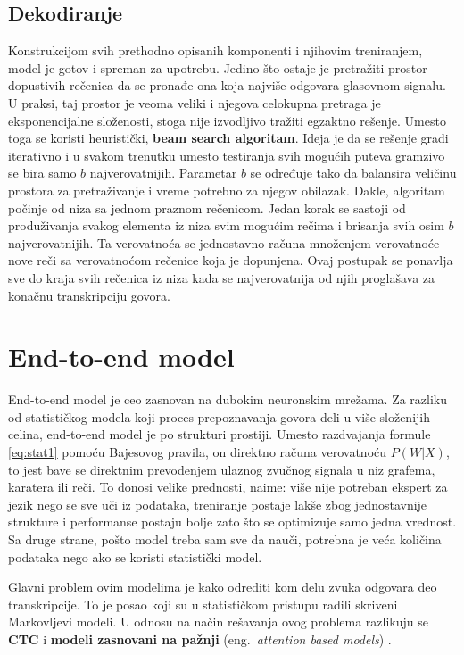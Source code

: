 \documentclass[a4paper]{article}
\begin{document}
\subsection{Dekodiranje}
\label{sec:dekodiranje}

Konstrukcijom svih prethodno opisanih komponenti i njihovim treniranjem, model je gotov i spreman za upotrebu.
Jedino što ostaje je pretražiti prostor dopustivih rečenica da se pronađe ona koja najviše odgovara glasovnom signalu.
U praksi, taj prostor je veoma veliki i njegova celokupna pretraga je eksponencijalne složenosti, stoga nije izvodljivo tražiti egzaktno rešenje.
Umesto toga se koristi heuristički, \textbf{beam search algoritam}.
Ideja je da se rešenje gradi iterativno i u svakom trenutku umesto testiranja svih mogućih puteva gramzivo se bira samo $b$ najverovatnijih.
Parametar $b$ se određuje tako da balansira veličinu prostora za pretraživanje i vreme potrebno za njegov obilazak.
Dakle, algoritam počinje od niza sa jednom praznom rečenicom.
Jedan korak se sastoji od produživanja svakog elementa iz niza svim mogućim rečima i brisanja svih osim $b$ najverovatnijih.
Ta verovatnoća se jednostavno računa množenjem verovatnoće nove reči sa verovatnoćom rečenice koja je dopunjena.
Ovaj postupak se ponavlja sve do kraja svih rečenica iz niza kada se najverovatnija od njih proglašava za konačnu transkripciju govora.

\section{End-to-end model}
\label{sec:e2e}

End-to-end model je ceo zasnovan na dubokim neuronskim mrežama.
Za razliku od statističkog modela koji proces prepoznavanja govora deli u više složenijih celina, end-to-end model je po strukturi prostiji.
Umesto razdvajanja formule \ref{eq:stat1} pomoću Bajesovog pravila, on direktno računa verovatnoću $P(W|X)$, to jest
bave se direktnim prevođenjem ulaznog zvučnog signala u niz grafema, karatera ili reči.
To donosi velike prednosti, naime: više nije potreban ekspert za jezik nego se sve uči iz podataka, treniranje postaje lakše zbog jednostavnije strukture i performanse postaju bolje zato što se optimizuje samo jedna vrednost.
Sa druge strane, pošto model treba sam sve da nauči, potrebna je veća količina podataka nego ako se koristi statistički model.

Glavni problem ovim modelima je kako odrediti kom delu zvuka odgovara deo transkripcije.
To je posao koji su u statističkom pristupu radili skriveni Markovljevi modeli.
U odnosu na način rešavanja ovog problema razlikuju se \textbf{CTC} \cite{graves2006ctc} i \textbf{modeli zasnovani na pažnji} (eng.~{\em attention based models}) \cite{chorowski2015attentionbased}.
\end{document}
